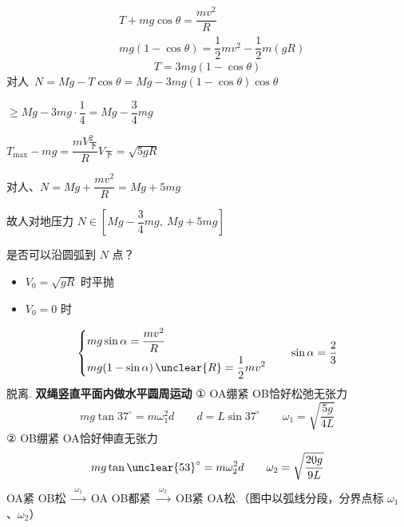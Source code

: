 \begin{problem}[例]
\begin{solution}
\begin{align*}
&T+mg\cos\theta=\dfrac{mv^2}{R}\\
&mg(1-\cos\theta)=\dfrac12mv^2-\dfrac12m(gR)
\end{align*}
\[ T=3mg(1-\cos\theta) \]
对人\ $N=Mg-T\cos\theta=Mg-3mg(1-\cos\theta)\cos\theta$

$\ge Mg-3mg\cdot\dfrac14=Mg-\dfrac34mg$

$T_{\max}-mg=\dfrac{mV_{\text{下}}^2}{R}$\qquad $V_{\text{下}}=\sqrt{5gR}$

对人、$N=Mg+\dfrac{mv^2}{R}=Mg+5mg$

故人对地压力 $N\in\left[Mg-\dfrac34mg,\ Mg+5mg\right]$
\end{solution}
\end{problem}
是否可以沿圆弧到 $N$ 点？
\begin{itemize}
\item $V_0=\sqrt{gR}$ 时平抛
\item $V_0=0$ 时
\end{itemize}
\[
\left\{\begin{aligned}
&mg\sin\alpha=\dfrac{mv^2}{R}\\
&mg(1-\sin\alpha)\,\unclear{R}=\dfrac12mv^2
\end{aligned}\right.
\qquad \sin\alpha=\dfrac23
\]
脱离.
\textbf{双绳竖直平面内做水平圆周运动}
① OA绷紧 OB恰好松弛无张力
\[ mg\tan37^\circ=m\omega_1^2d\qquad d=L\sin37^\circ\qquad \omega_1=\sqrt{\dfrac{5g}{4L}} \]
② OB绷紧 OA恰好伸直无张力
\[ mg\tan\unclear{53}^\circ=m\omega_2^2d\qquad \omega_2=\sqrt{\dfrac{20g}{9L}} \]
OA紧 OB松 $\xrightarrow{\ \omega_1\ }$ OA OB都紧 $\xrightarrow{\ \omega_2\ }$ OB紧 OA松.（图中以弧线分段，分界点标 $\omega_1$、$\omega_2$）

